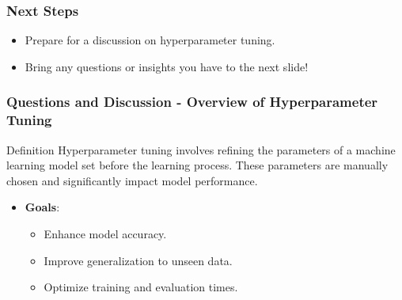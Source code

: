 \documentclass[aspectratio=169]{beamer}
\begin{document}
\begin{frame}[fragile]
    \frametitle{Next Steps}
    \begin{itemize}
        \item Prepare for a discussion on hyperparameter tuning.
        \item Bring any questions or insights you have to the next slide!
    \end{itemize}
\end{frame}

\begin{frame}[fragile]
  \frametitle{Questions and Discussion - Overview of Hyperparameter Tuning}
  
  \begin{block}{Definition}
  Hyperparameter tuning involves refining the parameters of a machine learning model set before the learning process. These parameters are manually chosen and significantly impact model performance.
  \end{block}
  
  \begin{itemize}
    \item \textbf{Goals}:
    \begin{itemize}
      \item Enhance model accuracy.
      \item Improve generalization to unseen data.
      \item Optimize training and evaluation times.
    \end{itemize}
  \end{itemize} 
\end{frame}
\end{document}
